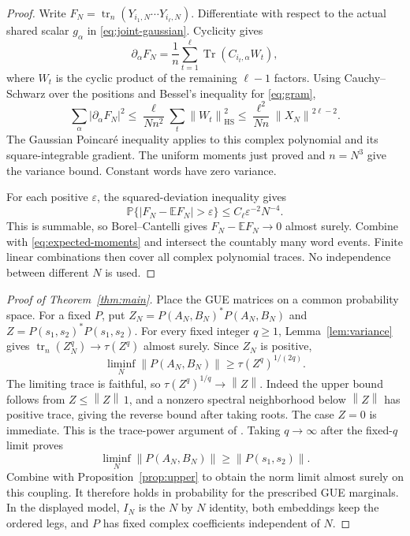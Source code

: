 \documentclass[11pt]{article}
\DeclareMathOperator{\Tr}{Tr}
\DeclareMathOperator{\tr}{tr}
\newcommand{\E}{\mathbb E}
\newcommand{\Prob}{\mathbb P}
\newcommand{\HS}{\mathrm{HS}}
\newcommand{\norm}[1]{\left\|#1\right\|}
\begin{document}
\begin{proof}
Write $F_N=\tr_n(Y_{i_1,N}\cdots Y_{i_\ell,N})$.
Differentiate with respect to the actual shared scalar $g_\alpha$
in \eqref{eq:joint-gaussian}. Cyclicity gives
\[
 \partial_\alpha F_N=\frac1n\sum_{t=1}^{\ell}
                  \Tr(C_{i_t,\alpha}W_t),
\]
where $W_t$ is the cyclic product of the remaining $\ell-1$ factors.
Using Cauchy--Schwarz over the positions and Bessel's inequality
for \eqref{eq:gram},
\[
 \sum_\alpha|\partial_\alpha F_N|^2
 \le\frac{\ell}{Nn^2}\sum_t\norm{W_t}_{\HS}^2
 \le\frac{\ell^2}{Nn}\norm{X_N}^{2\ell-2}.
\]
The Gaussian Poincar\'e inequality
\cite[Proposition~4.1 and Corollary~4.2]{HT}
applies to this complex polynomial and its square-integrable gradient.
The uniform moments just proved and $n=N^3$ give the variance bound.
Constant words have zero variance.

For each positive $\varepsilon$, the squared-deviation inequality gives
\[
 \Prob\{|F_N-\E F_N|>\varepsilon\}
          \le C_\ell\varepsilon^{-2}N^{-4}.
\]
This is summable, so Borel--Cantelli gives
$F_N-\E F_N\to0$ almost surely.
Combine with \eqref{eq:expected-moments} and intersect the countably
many word events. Finite linear combinations then cover all
complex polynomial traces. No independence between different $N$
is used.
\end{proof}

\begin{proof}[Proof of Theorem~\ref{thm:main}]
Place the GUE matrices on a common probability space.
For a fixed $P$, put
$Z_N=P(A_N,B_N)^*P(A_N,B_N)$ and
$Z=P(s_1,s_2)^*P(s_1,s_2)$.
For every fixed integer $q\ge1$, Lemma~\ref{lem:variance} gives
$\tr_n(Z_N^q)\to\tau(Z^q)$ almost surely. Since $Z_N$ is positive,
\[
 \liminf_N\norm{P(A_N,B_N)}
       \ge \tau(Z^q)^{1/(2q)}.
\]
The limiting trace is faithful, so
$\tau(Z^q)^{1/q}\to\norm Z$.
Indeed the upper bound follows from $Z\le\norm Z\,1$, and a nonzero
spectral neighborhood below $\norm Z$ has positive trace, giving the
reverse bound after taking roots. The case $Z=0$ is immediate.
This is the trace-power argument of \cite[Lemma~4.1]{JLNP}.
Taking $q\to\infty$ after the fixed-$q$ limit proves
\[
 \liminf_N\norm{P(A_N,B_N)}\ge\norm{P(s_1,s_2)}.
\]
Combine with Proposition~\ref{prop:upper} to obtain the norm limit
almost surely on this coupling. It therefore holds in probability
for the prescribed GUE marginals. In the displayed model, $I_N$
is the $N$ by $N$ identity, both embeddings keep the ordered legs,
and $P$ has fixed complex coefficients independent of $N$.
\end{proof}
\end{document}
